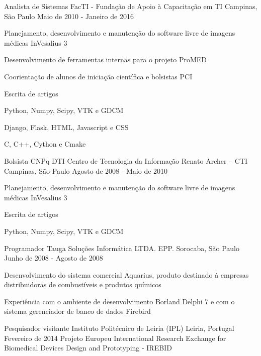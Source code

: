 \begin{cventries}
  \cventry
  {Analista de Sistemas}
  {FacTI - Fundação de Apoio à Capacitação em TI}
  {Campinas, São Paulo}
  {Maio de 2010 - Janeiro de 2016}
  {
    \begin{cvitems}
      \item {Planejamento, desenvolvimento e manutenção do software livre de imagens médicas InVesalius 3}
      \item {Desenvolvimento de ferramentas internas para o projeto ProMED}
      \item {Coorientação de alunos de iniciação científica e bolsistas PCI}
      \item {Escrita de artigos}
      \item {Python, Numpy, Scipy, VTK e GDCM}
      \item {Django, Flask, HTML, Javascript e CSS}
      \item {C, C++, Cython e Cmake}
      \end{cvitems}
    }

    \cventry
    {Bolsista CNPq DTI}
    {Centro de Tecnologia da Informação Renato Archer – CTI}
    {Campinas, São Paulo}
    {Agosto de 2008 - Maio de 2010}
    {
      \begin{cvitems}
      \item {Planejamento, desenvolvimento e manutenção do software livre de imagens médicas InVesalius 3}
      \item {Escrita de artigos}
      \item {Python, Numpy, Scipy, VTK e GDCM}
      \end{cvitems}
    }

    \cventry
    {Programador}
    {Tauga Soluções Informática LTDA. EPP.}
    {Sorocaba, São Paulo}
    {Junho de 2008 - Agosto de 2008}
    {
      \begin{cvitems}
      \item{Desenvolvimento do sistema comercial Aquarius, produto destinado à empresas distribuidoras de combustíveis e produtos químicos}
      \item {Experiência com o ambiente de desenvolvimento Borland Delphi 7 e com o sistema gerenciador de banco de dados Firebird}
      \end{cvitems}
    }

  \end{cventries}


\begin{cventries}

  \cventry
    {Pesquisador visitante}
    {Instituto Politécnico de Leiria (IPL)}
    {Leiria, Portugal}
    {Fevereiro de 2014}
    {Projeto Europeu International Research Exchange for Biomedical Devices Design and Prototyping - IREBID}
  \end{cventries}
